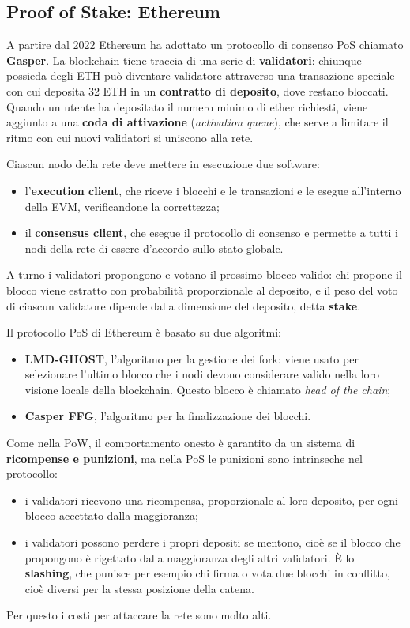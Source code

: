 \documentclass[a4paper, 11pt, oneside]{book}
\begin{document}
	\subsection{Proof of Stake: Ethereum}\label{sec:pos}
	A partire dal 2022 Ethereum ha adottato un protocollo di consenso PoS chiamato
	\textbf{Gasper}. La blockchain tiene traccia di una serie di \textbf{validatori}:
	chiunque possieda degli ETH può diventare validatore attraverso una transazione
	speciale con cui deposita 32 ETH in un \textbf{contratto di deposito}, dove restano
	bloccati. Quando un utente ha depositato il numero minimo di ether richiesti, viene
	aggiunto a una \textbf{coda di attivazione} (\textit{activation queue}), che serve a
	limitare il ritmo con cui nuovi validatori si uniscono alla rete.

	Ciascun nodo della rete deve mettere in esecuzione due software:
	\begin{itemize}
		\item l'\textbf{execution client}, che riceve i blocchi e le transazioni e le
			esegue all'interno della EVM, verificandone la correttezza;
		\item il \textbf{consensus client}, che esegue il protocollo di consenso e
			permette a tutti i nodi della rete di essere d'accordo sullo stato globale.
	\end{itemize}

	A turno i validatori propongono e votano il prossimo blocco valido: chi propone il
	blocco viene estratto con probabilità proporzionale al deposito, e il peso del voto
	di ciascun validatore dipende dalla dimensione del deposito, detta \textbf{stake}.

	Il protocollo PoS di Ethereum è basato su due algoritmi:
	\begin{itemize}
		\item \textbf{LMD-GHOST}, l'algoritmo per la gestione dei fork: viene usato per
			selezionare l'ultimo blocco che i nodi devono considerare valido nella loro
			visione locale della blockchain. Questo blocco è chiamato \textit{head of the
			chain};
		\item \textbf{Casper FFG}, l'algoritmo per la finalizzazione dei blocchi.
	\end{itemize}

	Come nella PoW, il comportamento onesto è garantito da un sistema di
	\textbf{ricompense e punizioni}, ma nella PoS le punizioni sono intrinseche nel
	protocollo:
	\begin{itemize}
		\item i validatori ricevono una ricompensa, proporzionale al loro deposito, per
			ogni blocco accettato dalla maggioranza;
		\item i validatori possono perdere i propri depositi se mentono, cioè se il blocco
			che propongono è rigettato dalla maggioranza degli altri validatori. È lo
			\textbf{slashing}, che punisce per esempio chi firma o vota due blocchi in
			conflitto, cioè diversi per la stessa posizione della catena.
	\end{itemize}
	Per questo i costi per attaccare la rete sono molto alti.
\end{document}
